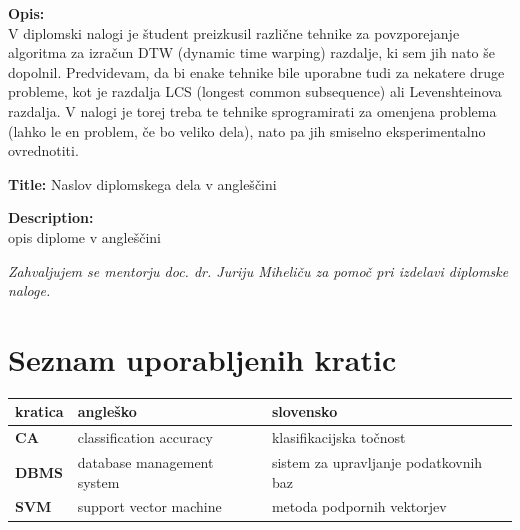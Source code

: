 \documentclass[a4paper,12pt,openright]{book}
\newcommand{\clearemptydoublepage}{\newpage{\pagestyle{empty}\cleardoublepage}}
\begin{document}
\bigskip
\noindent\textbf{Opis:}\\
V diplomski nalogi je študent preizkusil različne tehnike za povzporejanje algoritma za izračun DTW (dynamic time warping) razdalje, ki sem jih nato še dopolnil. Predvidevam, da bi enake tehnike bile uporabne tudi za nekatere druge probleme, kot je razdalja LCS (longest common subsequence) ali Levenshteinova razdalja. V nalogi je torej treba te tehnike sprogramirati za omenjena problema (lahko le en problem, če bo veliko dela), nato pa jih smiselno eksperimentalno ovrednotiti.

\bigskip
\noindent\textbf{Title:} Naslov diplomskega dela v angleščini

\bigskip
\noindent\textbf{Description:}\\
opis diplome v angleščini

\vfill



\vspace{2cm}

\clearemptydoublepage

\thispagestyle{empty}\mbox{}\vfill\null\it%
\noindent
Zahvaljujem se mentorju doc. dr. Juriju Miheliču za pomoč pri izdelavi diplomske naloge. 
\rm\normalfont

\clearemptydoublepage

\thispagestyle{empty}\mbox{}{\textheight}\mbox{}\hfill\begin{minipage}{0.55\textwidth}%
\normalfont\end{minipage}

\clearemptydoublepage


\pagestyle{empty}
\def\thepage{}%
\tableofcontents{}


\clearemptydoublepage


\chapter*{Seznam uporabljenih kratic}

\noindent\begin{tabular}{p{}|p{}|p{}}    %
  {\bf kratica} & {\bf angleško}                              & {\bf slovensko} \\ \hline
  {\bf CA}      & classification accuracy               & klasifikacijska točnost \\
  {\bf DBMS} & database management system & sistem za upravljanje podatkovnih baz \\
  {\bf SVM}   & support vector machine              & metoda podpornih vektorjev \\
\end{tabular}
\end{document}
